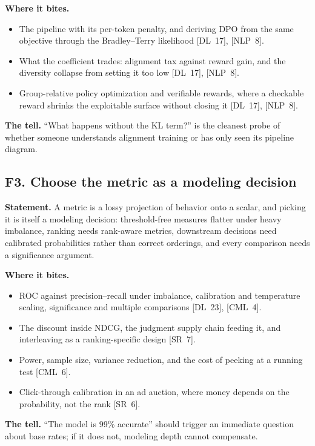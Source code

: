 \textbf{Where it bites.}
\begin{itemize}[itemsep=1pt,topsep=2pt,leftmargin=1.3em]
\item The pipeline with its per-token penalty, and deriving DPO from the same objective through the Bradley--Terry likelihood [DL~17], [NLP~8].
\item What the coefficient trades: alignment tax against reward gain, and the diversity collapse from setting it too low [DL~17], [NLP~8].
\item Group-relative policy optimization and verifiable rewards, where a checkable reward shrinks the exploitable surface without closing it [DL~17], [NLP~8].
\end{itemize}

\textbf{The tell.} ``What happens without the KL term?'' is the cleanest probe of whether someone understands alignment training or has only seen its pipeline diagram.

\subsection*{F3. Choose the metric as a modeling decision}

\textbf{Statement.} A metric is a lossy projection of behavior onto a scalar, and picking it is itself a modeling decision: threshold-free measures flatter under heavy imbalance, ranking needs rank-aware metrics, downstream decisions need calibrated probabilities rather than correct orderings, and every comparison needs a significance argument.

\textbf{Where it bites.}
\begin{itemize}[itemsep=1pt,topsep=2pt,leftmargin=1.3em]
\item ROC against precision--recall under imbalance, calibration and temperature scaling, significance and multiple comparisons [DL~23], [CML~4].
\item The discount inside NDCG, the judgment supply chain feeding it, and interleaving as a ranking-specific design [SR~7].
\item Power, sample size, variance reduction, and the cost of peeking at a running test [CML~6].
\item Click-through calibration in an ad auction, where money depends on the probability, not the rank [SR~6].
\end{itemize}

\textbf{The tell.} ``The model is 99\% accurate'' should trigger an immediate question about base rates; if it does not, modeling depth cannot compensate.

